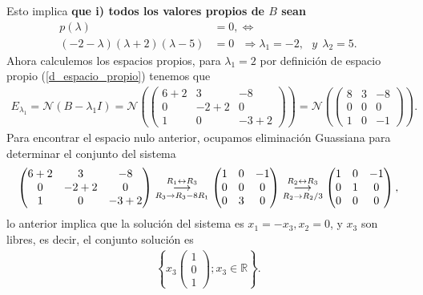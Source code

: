 \documentclass[11pt,letterpaper]{article}
\newcommand{\mR}{\mathbb{R}}
\newcommand{\mcN}{\mathcal{N}}
\newcommand{\grstep}[2][\relax]{%
   \ensuremath{\mathrel{
       {\mathop{\longrightarrow}\limits^{#2\mathstrut}_{
                                     \begin{subarray}{l} #1 \end{subarray}}}}}}
\begin{document}
\begin{enumerate}
Esto implica \textbf{que i) todos los valores propios de $B$ sean}
\begin{align*}
p(\lambda)&=0,\Leftrightarrow\\
(-2-\lambda)(\lambda+2)(\lambda-5)&=0\ \ \ \Rightarrow \lambda_1=-2, \ \ \ y \ \ \lambda_2=5.
\end{align*}
Ahora calculemos los espacios propios, para $\lambda_1=2$ por definición de espacio propio (\ref{d_espacio_propio}) tenemos que 
\begin{align*}
E_{\lambda_1} = \mcN(B-\lambda_1 I) =\mcN\left( \begin{pmatrix}
6+2 & 3 &-8\\
0 & -2+2 & 0\\
1 & 0 &-3+2
\end{pmatrix} \right)=\mcN\left( \begin{pmatrix}
8 & 3 &-8\\
0 & 0 & 0\\
1 & 0 &-1
\end{pmatrix} \right).
\end{align*}
Para encontrar el espacio nulo anterior, ocupamos eliminación Guassiana para determinar el conjunto del sistema
\begin{align*}
\begin{pmatrix}
6+2 & 3 &-8\\
0 & -2+2 & 0\\
1 & 0 &-3+2
\end{pmatrix}%
\grstep[R_3\rightarrow R_3-8R_1]{R_1 \leftrightarrow R_3}
%
\begin{pmatrix}
1 & 0 &-1\\
0 & 0 & 0\\
0 & 3 & 0\\
\end{pmatrix}%
\grstep[R_2\rightarrow R_2/3]{R_2 \leftrightarrow R_3}
%
\begin{pmatrix}
1 & 0 &-1\\
0 & 1 & 0\\
0 & 0 & 0\\
\end{pmatrix},
\end{align*}
lo anterior implica que la solución del sistema es $x_1=-x_3, x_2=0$, y $x_3$ son libres, es decir, el conjunto solución es
\begin{align*}
\left\{x_3\begin{pmatrix}
1\\
0\\
1
\end{pmatrix}; x_3\in \mR \right\}.

\end{align*}
\end{enumerate}
\end{document}
